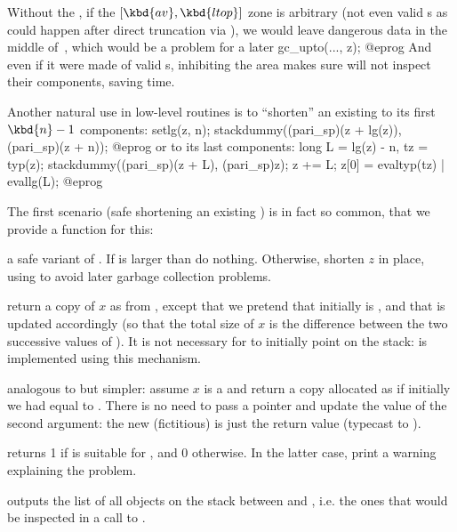 Without the , if the $[\kbd{av}, \kbd{ltop}]$ zone is
arbitrary (not even valid s as could happen after direct
truncation via ), we would leave dangerous data in the middle
of~, which would be a problem for a later
\bprog
  gc_upto(..., z);
@eprog\noindent
And even if it were made of valid s, inhibiting the area makes sure
 will not inspect their components, saving time.

Another natural use in low-level routines is to ``shorten'' an existing
  to its first $\kbd{n}-1$ components:
\bprog
  setlg(z, n);
  stackdummy((pari_sp)(z + lg(z)), (pari_sp)(z + n));
@eprog\noindent
or to its last  components:
\bprog
  long L = lg(z) - n, tz = typ(z);
  stackdummy((pari_sp)(z + L), (pari_sp)z);
  z += L; z[0] = evaltyp(tz) | evallg(L);
@eprog

The first scenario (safe shortening an existing ) is in fact so
common, that we provide a function for this:

 a safe variant of . If
 is larger than  do nothing. Otherwise, shorten $z$ in
place, using  to avoid later garbage collection problems.

 return a copy of $x$ as from
, except that we pretend that initially  is ,
and that  is updated accordingly (so that the total size of $x$ is
the difference between the two successive values of ). It is not
necessary for  to initially point on the stack:  is
implemented using this mechanism.

 analogous to  but
simpler: assume $x$ is a  and return a copy allocated as if
initially we had  equal to . There is no need to pass a
pointer and update the value of the second argument: the new (fictitious)
 is just the return value (typecast to ).


 returns 1 if  is suitable for
, and 0 otherwise. In the latter case, print a warning
explaining the problem.

 outputs the list of all objects on the
stack between  and , i.e. the ones that would be inspected
in a call to .

